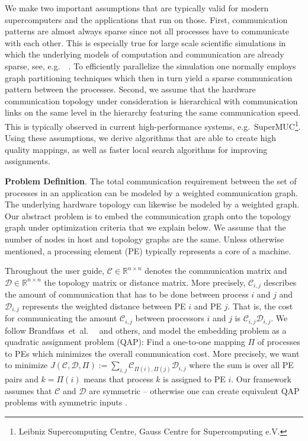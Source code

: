 \documentclass[11pt]{article}
\newcommand{\etal}{et~al.\ }
\newcommand{\eg}{e.g.\ }
\def\MdR{\ensuremath{\mathbb{R}}}
\begin{document}
We make two important assumptions that are typically
valid for modern supercomputers and the applications that run on
those.  First, communication patterns are almost always sparse since
not all processes have to communicate with each other.  This is
especially true for large scale scientific simulations in which the
underlying models of computation and communication are already sparse, see,
\eg~\cite{catalyuerek1996dis,heuvelinecoop,schloegel2000gph}.
To efficiently parallelize the simulation one normally employs graph
partitioning techniques which then in turn yield a sparse
communication pattern between the processes.  Second, we assume that
the hardware communication topology under consideration is
hierarchical with communication links on the same level in the
hierarchy featuring the same communication speed. This is typically
observed in current high-performance systems, \eg SuperMUC\footnote{Leibniz Supercomputing Centre, Gauss Centre for Supercomputing e.V.}.
Using these assumptions, we derive algorithms that are able to create high quality mappings, as well as faster local search algorithms for improving assignments. 

\textbf{Problem Definition}. The total communication requirement between the set of processes in an application can be modeled by a weighted communication graph. 
The underlying hardware topology can likewise be modeled by a weighted graph.
Our abstract problem
is to embed the communication graph onto the topology graph under optimization criteria that we explain below. We assume 
that the number of nodes in host and topology graphs are the same.
Unless otherwise mentioned, a processing element (PE) typically represents a core of a machine. 

Throughout the user guide, $\mathcal{C}\in \MdR^{n \times n}$ denotes the communication matrix and $\mathcal{D}\in \MdR^{n \times n}$ the topology matrix or distance matrix. More precisely, $\mathcal{C}_{i,j}$ describes the amount of communication that has to be done between process $i$ and $j$ and $\mathcal{D}_{i,j}$ represents the weighted distance between PE $i$ and PE $j$.
That is, the cost for communicating the amount $\mathcal{C}_{i,j}$ between processors $i$ and $j$ is $\mathcal{C}_{i,j}\mathcal{D}_{i,j}$.
We follow Brandfass~\etal~\cite{brandfass2013rank} and others, and model the embedding problem as a quadratic assignment problem (QAP): Find a one-to-one mapping $\Pi$ of processes to PEs which minimizes the overall communication cost. More precisely, we want to minimize 
$J(\mathcal{C},\mathcal{D}, \Pi) := \sum_{i,j} \mathcal{C}_{\Pi(i), \Pi(j)}\mathcal{D}_{i,j}$ 
where the sum is over all PE pairs and $k=\Pi(i)$ means that process $k$ is assigned to PE $i$. 
Our framework assumes that $\mathcal{C}$ and $\mathcal{D}$ are symmetric -- otherwise one can create equivalent QAP problems with symmetric inputs \cite{brandfass2013rank}.
\end{document}
